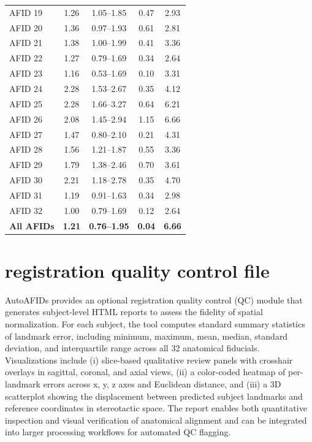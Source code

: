 \begin{table}[H]
\begin{tabular}{lcccc}
AFID 19 & 1.26 & 1.05--1.85 & 0.47 & 2.93 \\
AFID 20 & 1.36 & 0.97--1.93 & 0.61 & 2.81 \\
AFID 21 & 1.38 & 1.00--1.99 & 0.41 & 3.36 \\
AFID 22 & 1.27 & 0.79--1.69 & 0.34 & 2.64 \\
AFID 23 & 1.16 & 0.53--1.69 & 0.10 & 3.31 \\
AFID 24 & 2.28 & 1.53--2.67 & 0.35 & 4.12 \\
AFID 25 & 2.28 & 1.66--3.27 & 0.64 & 6.21 \\
AFID 26 & 2.08 & 1.45--2.94 & 1.15 & 6.66 \\
AFID 27 & 1.47 & 0.80--2.10 & 0.21 & 4.31 \\
AFID 28 & 1.56 & 1.21--1.87 & 0.55 & 3.36 \\
AFID 29 & 1.79 & 1.38--2.46 & 0.70 & 3.61 \\
AFID 30 & 2.21 & 1.18--2.78 & 0.35 & 4.70 \\
AFID 31 & 1.19 & 0.91--1.63 & 0.34 & 2.98 \\
AFID 32 & 1.00 & 0.79--1.69 & 0.12 & 2.64 \\
\midrule
\textbf{All AFIDs} & \textbf{1.21} & \textbf{0.76--1.95} & \textbf{0.04} & \textbf{6.66} \\
\bottomrule
\end{tabular}
\end{table}

\newpage
\section{registration quality control file}
AutoAFIDs provides an optional registration quality control (QC) module that generates subject-level HTML reports to assess the fidelity of spatial normalization. For each subject, the tool computes standard summary statistics of landmark error, including minimum, maximum, mean, median, standard deviation, and interquartile range across all 32 anatomical fiducials. Visualizations include (i) slice-based qualitative review panels with crosshair overlays in sagittal, coronal, and axial views, (ii) a color-coded heatmap of per-landmark errors across x, y, z axes and Euclidean distance, and (iii) a 3D scatterplot showing the displacement between predicted subject landmarks and reference coordinates in stereotactic space. The report enables both quantitative inspection and visual verification of anatomical alignment and can be integrated into larger processing workflows for automated QC flagging.

